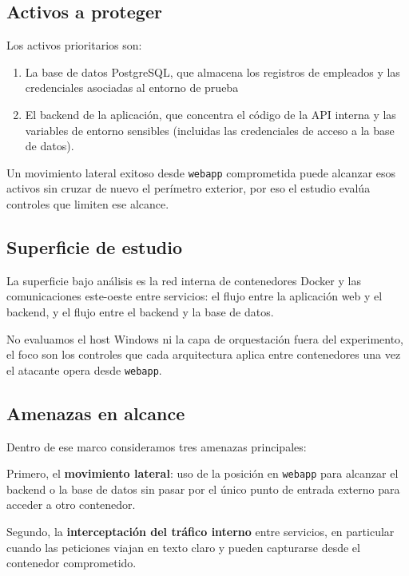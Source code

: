 \documentclass[11pt,spanish,listoffigures,listoftables]{tfgetsinf}
\begin{document}
        \subsection{Activos a proteger}
        \label{sec:3.2.2}
        Los activos prioritarios son: 
            \begin{enumerate}
                \item La base de datos PostgreSQL, que almacena los registros de empleados y las credenciales asociadas al entorno de prueba
                \item El backend de la aplicación, que concentra el código de la API interna y las variables de entorno sensibles (incluidas las credenciales de acceso a la base de datos).
            \end{enumerate}
            Un movimiento lateral exitoso desde \texttt{webapp} comprometida puede alcanzar esos activos sin cruzar de nuevo el perímetro exterior, por eso el estudio evalúa controles que limiten ese alcance.
            
        \subsection{Superficie de estudio}
        \label{sec:3.2.3}
        La superficie bajo análisis es la red interna de contenedores Docker y las comunicaciones este-oeste entre servicios: el flujo entre la aplicación web y el backend, y el flujo entre el backend y la base de datos. 

        No evaluamos el host Windows ni la capa de orquestación fuera del experimento, el foco son los controles que cada arquitectura aplica entre contenedores una vez el atacante opera desde \texttt{webapp}.
        
        \subsection{Amenazas en alcance}
        \label{sec:3.2.4}
        Dentro de ese marco consideramos tres amenazas principales:

        Primero, el \textbf{movimiento lateral}: uso de la posición en \texttt{webapp} para alcanzar el backend o la base de datos sin pasar por el único punto de entrada externo para acceder a otro contenedor.
        
        Segundo, la \textbf{interceptación del tráfico interno} entre servicios, en particular cuando las peticiones viajan en texto claro y pueden capturarse desde el contenedor comprometido. 
        
\end{document}
